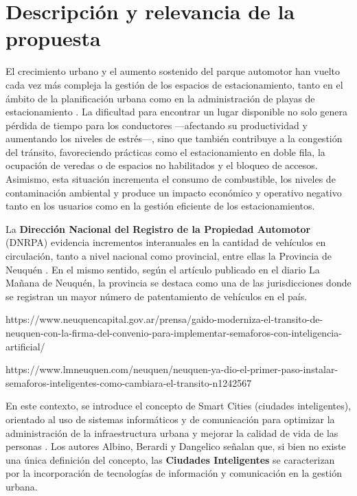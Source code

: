 \documentclass[12pt,a4paper]{article}
\newcommand{\gl}{\guillemotleft{}}
\newcommand{\gr}{\guillemotright{}}
\begin{document}
\section{Descripción y relevancia de la propuesta}
El crecimiento urbano y el aumento sostenido del parque automotor han vuelto cada vez más compleja la gestión de los espacios de estacionamiento, tanto en el ámbito de la planificación urbana como en la administración de playas de estacionamiento  \cite{channamallu2023review}. La dificultad para encontrar un lugar disponible no solo genera pérdida de tiempo para los conductores —afectando su productividad y aumentando los niveles de estrés—, sino que también contribuye a la congestión del tránsito, favoreciendo prácticas como el estacionamiento en doble fila, la ocupación de veredas o de espacios no habilitados y el bloqueo de accesos. Asimismo, esta situación incrementa el consumo de combustible, los niveles de contaminación ambiental y produce un impacto económico y operativo negativo tanto en los usuarios como en la gestión eficiente de los estacionamientos.


La \textbf{Dirección Nacional del Registro de la Propiedad Automotor} (DNRPA) evidencia incrementos interanuales en la cantidad de vehículos en circulación, tanto a nivel nacional como provincial, entre ellas la Provincia de Neuquén \cite{dnrpa2026parque}. En el mismo sentido, según el artículo \cite{lmneuquen2026patentamientos} publicado en el diario \gl{}La Mañana de Neuquén\gr{}, la provincia se destaca como una de las jurisdicciones donde se registran un mayor número de patentamiento de vehículos en el país.

https://www.neuquencapital.gov.ar/prensa/gaido-moderniza-el-transito-de-neuquen-con-la-firma-del-convenio-para-implementar-semaforos-con-inteligencia-artificial/

https://www.lmneuquen.com/neuquen/neuquen-ya-dio-el-primer-paso-instalar-semaforos-inteligentes-como-cambiara-el-transito-n1242567




En este contexto, se introduce el concepto de Smart Cities (ciudades inteligentes), orientado al uso de sistemas informáticos y de comunicación para optimizar la administración de la infraestructura urbana y mejorar la calidad de vida de las personas 
\cite{caragliu2011smart}. Los autores Albino, Berardi y Dangelico \cite{albino2015smart}  señalan que, si bien no existe una única definición del concepto, las \textbf{\gl{}Ciudades Inteligentes\gr{}} se caracterizan por la incorporación de tecnologías de información y comunicación en la gestión urbana.
\end{document}
